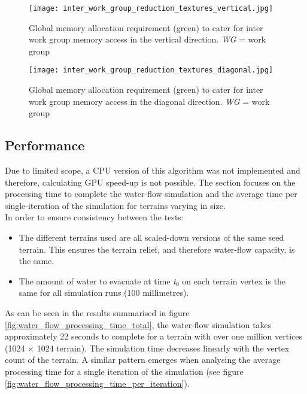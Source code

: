 \begin{figure}
\center
	\texttt{[image: inter\_work\_group\_reduction\_textures\_vertical.jpg]}
	\caption{ Global memory allocation requirement (green) to cater for inter work group memory access in the vertical direction. \textit{WG} = work group}
	\label{fig:water_flow_inter_wg_reduc_vert}
\end{figure}

\begin{figure}
\center
	\texttt{[image: inter\_work\_group\_reduction\_textures\_diagonal.jpg]}
	\caption{ Global memory allocation requirement (green) to cater for inter work group memory access in the diagonal direction. \textit{WG} = work group}
	\label{fig:water_flow_inter_wg_reduc_diag}
\end{figure}

\subsection{Performance}

Due to limited scope, a CPU version of this algorithm was not implemented and therefore, calculating GPU speed-up is not possible. The section focuses on the processing time to complete the water-flow simulation and the average time per single-iteration of the simulation for terrains varying in size. \\
In order to ensure consistency between the tests:
\begin{itemize}
\item The different terrains used are all scaled-down versions of the same seed terrain. This ensures the terrain relief, and therefore water-flow capacity, is the same.\\
\item The amount of water to evacuate at time \textit{t$_{0}$} on each terrain vertex is the same for all simulation runs (100 millimetres). \\
\end{itemize}

As can be seen in the results summarised in figure \ref{fig:water_flow_processing_time_total}, the water-flow simulation takes approximately 22 seconds to complete for a terrain with over one million vertices (1024 $\times$ 1024 terrain). The simulation time decreases linearly with the vertex count of the terrain. A similar pattern emerges when analysing the average processing time for a single iteration of the simulation (see figure \ref{fig:water_flow_processing_time_per_iteration}).

